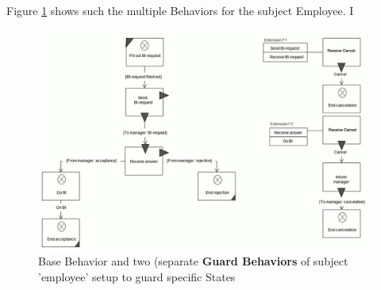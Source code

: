 Figure \ref{fig:extension1} shows such the multiple Behaviors for the subject Employee. I 

\begin{figure}[htbp]
	\centering
	\includegraphics[width=0.7\linewidth]{Figures/Ontology/SubjectBehavior/Extension}
	\caption[Base Behavior and two (separate \textbf{Guard Behaviors} of subject 'employee'.]{Base Behavior and two (separate \textbf{Guard Behaviors} of subject 'employee' setup to guard specific States}
	\label{fig:extension1}
\end{figure}





